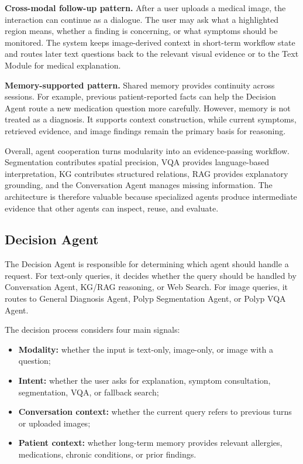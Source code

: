 \textbf{Cross-modal follow-up pattern.} After a user uploads a medical image, the interaction can continue as a dialogue. The user may ask what a highlighted region means, whether a finding is concerning, or what symptoms should be monitored. The system keeps image-derived context in short-term workflow state and routes later text questions back to the relevant visual evidence or to the Text Module for medical explanation.

\textbf{Memory-supported pattern.} Shared memory provides continuity across sessions. For example, previous patient-reported facts can help the Decision Agent route a new medication question more carefully. However, memory is not treated as a diagnosis. It supports context construction, while current symptoms, retrieved evidence, and image findings remain the primary basis for reasoning.

Overall, agent cooperation turns modularity into an evidence-passing workflow. Segmentation contributes spatial precision, VQA provides language-based interpretation, KG contributes structured relations, RAG provides explanatory grounding, and the Conversation Agent manages missing information. The architecture is therefore valuable because specialized agents produce intermediate evidence that other agents can inspect, reuse, and evaluate.

\subsection{Decision Agent}

The Decision Agent is responsible for determining which agent should handle a request. For text-only queries, it decides whether the query should be handled by Conversation Agent, KG/RAG reasoning, or Web Search. For image queries, it routes to General Diagnosis Agent, Polyp Segmentation Agent, or Polyp VQA Agent.

The decision process considers four main signals:

\begin{itemize}
    \item \textbf{Modality:} whether the input is text-only, image-only, or image with a question;
    \item \textbf{Intent:} whether the user asks for explanation, symptom consultation, segmentation, VQA, or fallback search;
    \item \textbf{Conversation context:} whether the current query refers to previous turns or uploaded images;
    \item \textbf{Patient context:} whether long-term memory provides relevant allergies, medications, chronic conditions, or prior findings.
\end{itemize}

